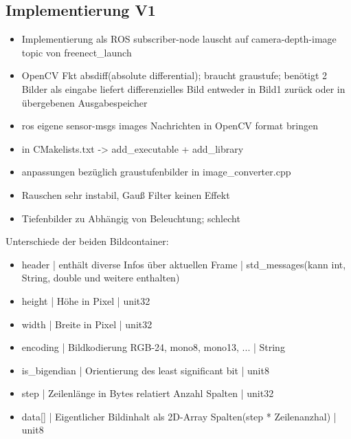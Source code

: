 					
		\subsection{Implementierung V1}
		
		\begin{itemize}
				\item Implementierung als ROS subscriber-node lauscht auf camera-depth-image topic von freenect\_launch
				\item OpenCV Fkt absdiff(absolute differential); braucht graustufe; benötigt 2 Bilder als eingabe liefert differenzielles Bild entweder in Bild1 zurück oder in übergebenen Ausgabespeicher
				\item ros eigene sensor-msgs images Nachrichten in OpenCV format bringen
				\item in CMakelists.txt -> add\_executable + add\_library
				\item anpassungen bezüglich graustufenbilder in image\_converter.cpp
				\item Rauschen sehr instabil, Gauß Filter keinen Effekt
				\item Tiefenbilder zu Abhängig von Beleuchtung; schlecht
		\end{itemize}

		Unterschiede der beiden Bildcontainer:\\
		 \begin{itemize}
		 \item header | enthält diverse Infos über aktuellen Frame | std\_messages(kann int, String, double und weitere enthalten)
		 \item height | Höhe in Pixel | unit32 \\ 
		 \item width | Breite in Pixel | unit32\\
		 \item encoding | Bildkodierung RGB-24, mono8, mono13, ... | String\\ 
		 \item is\_bigendian | Orientierung des least significant bit | unit8\\
		 \item step | Zeilenlänge in Bytes relatiert Anzahl Spalten | unit32\\
		 \item data[] | Eigentlicher Bildinhalt als 2D-Array Spalten(step * Zeilenanzhal) | unit8\\
		 \end{itemize}
		 
